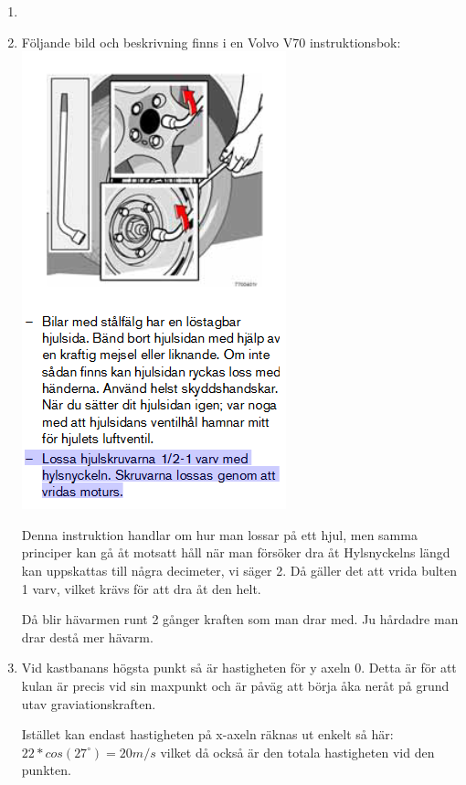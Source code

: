 \documentclass[a4paper,12pt]{article}
\begin{document}
\begin{enumerate}
    \item



    \item
          Följande bild och beskrivning finns i en Volvo V70 instruktionsbok:
          \includegraphics{Figur.png}

          Denna instruktion handlar om hur man lossar på ett hjul, men samma principer
          kan gå åt motsatt håll när man försöker dra åt
          Hylsnyckelns längd kan uppskattas till några decimeter, vi säger 2. Då gäller det att vrida
          bulten 1 varv, vilket krävs för att dra åt den helt.

          Då blir hävarmen runt 2 gånger kraften som man drar med. Ju hårdadre man drar destå
          mer hävarm.

    \item
          Vid kastbanans högsta punkt så är hastigheten för y axeln 0. Detta är för att
          kulan är precis vid sin maxpunkt och är påväg att börja åka neråt på grund utav
          graviationskraften.

          Istället kan endast hastigheten på x-axeln räknas ut enkelt så här:
          $22*cos(27^\circ)=20 m/s$ vilket då också är den totala hastigheten vid den punkten.


\end{enumerate}
\end{document}
